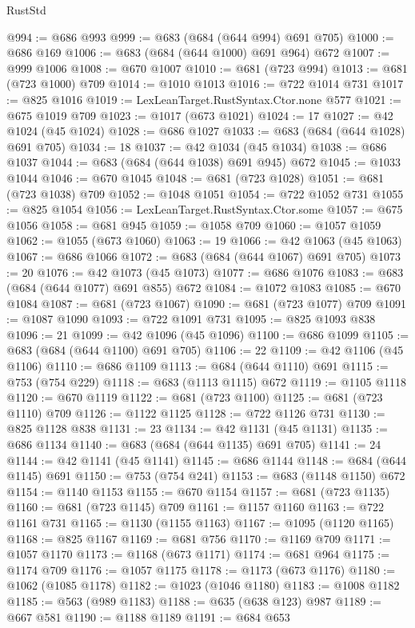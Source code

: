 \begin{lexlean}{RustStd}
\begin{coremodule}
@994 := @686 @993
@999 := @683 (@684 (@644 @994) @691 @705)
@1000 := @686 @169
@1006 := @683 (@684 (@644 @1000) @691 @964) @672
@1007 := @999 @1006
@1008 := @670 @1007
@1010 := @681 (@723 @994)
@1013 := @681 (@723 @1000) @709
@1014 := @1010 @1013
@1016 := @722 @1014 @731
@1017 := @825 @1016
@1019 := LexLeanTarget.RustSyntax.Ctor.none @577
@1021 := @675 @1019 @709
@1023 := @1017 (@673 @1021)
@1024 := 17
@1027 := @42 @1024 (@45 @1024)
@1028 := @686 @1027
@1033 := @683 (@684 (@644 @1028) @691 @705)
@1034 := 18
@1037 := @42 @1034 (@45 @1034)
@1038 := @686 @1037
@1044 := @683 (@684 (@644 @1038) @691 @945) @672
@1045 := @1033 @1044
@1046 := @670 @1045
@1048 := @681 (@723 @1028)
@1051 := @681 (@723 @1038) @709
@1052 := @1048 @1051
@1054 := @722 @1052 @731
@1055 := @825 @1054
@1056 := LexLeanTarget.RustSyntax.Ctor.some
@1057 := @675 @1056
@1058 := @681 @945
@1059 := @1058 @709
@1060 := @1057 @1059
@1062 := @1055 (@673 @1060)
@1063 := 19
@1066 := @42 @1063 (@45 @1063)
@1067 := @686 @1066
@1072 := @683 (@684 (@644 @1067) @691 @705)
@1073 := 20
@1076 := @42 @1073 (@45 @1073)
@1077 := @686 @1076
@1083 := @683 (@684 (@644 @1077) @691 @855) @672
@1084 := @1072 @1083
@1085 := @670 @1084
@1087 := @681 (@723 @1067)
@1090 := @681 (@723 @1077) @709
@1091 := @1087 @1090
@1093 := @722 @1091 @731
@1095 := @825 @1093 @838
@1096 := 21
@1099 := @42 @1096 (@45 @1096)
@1100 := @686 @1099
@1105 := @683 (@684 (@644 @1100) @691 @705)
@1106 := 22
@1109 := @42 @1106 (@45 @1106)
@1110 := @686 @1109
@1113 := @684 (@644 @1110) @691
@1115 := @753 (@754 @229)
@1118 := @683 (@1113 @1115) @672
@1119 := @1105 @1118
@1120 := @670 @1119
@1122 := @681 (@723 @1100)
@1125 := @681 (@723 @1110) @709
@1126 := @1122 @1125
@1128 := @722 @1126 @731
@1130 := @825 @1128 @838
@1131 := 23
@1134 := @42 @1131 (@45 @1131)
@1135 := @686 @1134
@1140 := @683 (@684 (@644 @1135) @691 @705)
@1141 := 24
@1144 := @42 @1141 (@45 @1141)
@1145 := @686 @1144
@1148 := @684 (@644 @1145) @691
@1150 := @753 (@754 @241)
@1153 := @683 (@1148 @1150) @672
@1154 := @1140 @1153
@1155 := @670 @1154
@1157 := @681 (@723 @1135)
@1160 := @681 (@723 @1145) @709
@1161 := @1157 @1160
@1163 := @722 @1161 @731
@1165 := @1130 (@1155 @1163)
@1167 := @1095 (@1120 @1165)
@1168 := @825 @1167
@1169 := @681 @756
@1170 := @1169 @709
@1171 := @1057 @1170
@1173 := @1168 (@673 @1171)
@1174 := @681 @964
@1175 := @1174 @709
@1176 := @1057 @1175
@1178 := @1173 (@673 @1176)
@1180 := @1062 (@1085 @1178)
@1182 := @1023 (@1046 @1180)
@1183 := @1008 @1182
@1185 := @563 (@989 @1183)
@1188 := @635 (@638 @123) @987
@1189 := @667 @581
@1190 := @1188 @1189
@1191 := @684 @653

\end{coremodule}
\end{lexlean}
